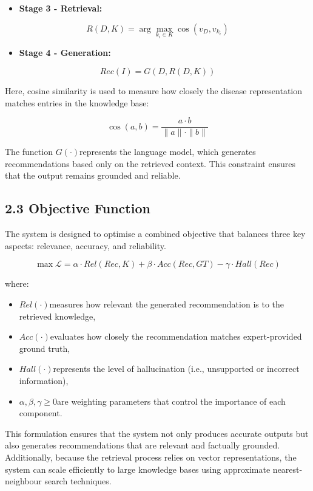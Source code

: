 \begin{itemize}
\item
  \textbf{Stage 3 - Retrieval:}
\end{itemize}

\[R(D,K) = \arg\underset{k_{i} \in K}{\max}\cos(v_{D},v_{k_{i}})
\]

\begin{itemize}
\item
  \textbf{Stage 4 - Generation:}
\end{itemize}

\[Rec(I) = G(D,R(D,K))
\]

Here, cosine similarity is used to measure how closely the disease
representation matches entries in the knowledge base:

\[\cos(a,b) = \frac{a \cdot b}{\parallel a \parallel \cdot \parallel b \parallel}
\]

The function \(G( \cdot )\)represents the language model, which
generates recommendations based only on the retrieved context. This
constraint ensures that the output remains grounded and reliable.

\subsection*{2.3 Objective Function}\label{objective-function}

The system is designed to optimise a combined objective that balances
three key aspects: relevance, accuracy, and reliability.

\[\max\mathcal{L} = \alpha \cdot Rel(Rec,K) + \beta \cdot Acc(Rec,GT) - \gamma \cdot Hall(Rec)\]

where:

\begin{itemize}
\item
  \(Rel( \cdot )\)measures how relevant the generated recommendation is
  to the retrieved knowledge,
\item
  \(Acc( \cdot )\)evaluates how closely the recommendation matches
  expert-provided ground truth,
\item
  \(Hall( \cdot )\)represents the level of hallucination (i.e.,
  unsupported or incorrect information),
\item
  \(\alpha,\beta,\gamma \geq 0\)are weighting parameters that control
  the importance of each component.
\end{itemize}

This formulation ensures that the system not only produces accurate
outputs but also generates recommendations that are relevant and
factually grounded. Additionally, because the retrieval process relies
on vector representations, the system can scale efficiently to large
knowledge bases using approximate nearest-neighbour search techniques.


